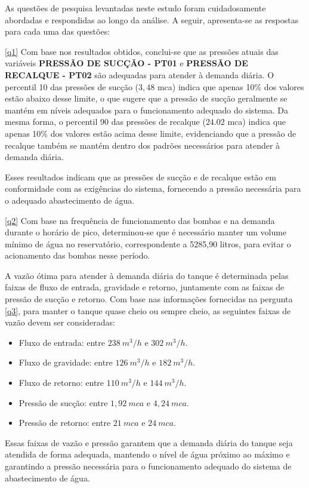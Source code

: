As questões de pesquisa levantadas neste estudo foram cuidadosamente abordadas e respondidas ao longo da análise. A seguir, apresenta-se as respostas para cada uma das questões:

\ref{q1} Com base nos resultados obtidos, conclui-se que as pressões atuais das variáveis \textbf{PRESSÃO DE SUCÇÃO - PT01} e \textbf{PRESSÃO DE RECALQUE - PT02} são adequadas para atender à demanda diária. O percentil 10 das pressões de sucção ($3,48$ mca) indica que apenas 10\% dos valores estão abaixo desse limite, o que sugere que a pressão de sucção geralmente se mantém em níveis adequados para o funcionamento adequado do sistema. Da mesma forma, o percentil 90 das pressões de recalque ($24.02$ mca) indica que apenas 10\% dos valores estão acima desse limite, evidenciando que a pressão de recalque também se mantém dentro dos padrões necessários para atender à demanda diária.

Esses resultados indicam que as pressões de sucção e de recalque estão em conformidade com as exigências do sistema, fornecendo a pressão necessária para o adequado abastecimento de água.

\ref{q2} Com base na frequência de funcionamento das bombas e na demanda durante o horário de pico, determinou-se que é necessário manter um volume mínimo de água no reservatório, correspondente a 5285,90 litros, para evitar o acionamento das bombas nesse período.

A vazão ótima para atender à demanda diária do tanque é determinada pelas faixas de fluxo de entrada, gravidade e retorno, juntamente com as faixas de pressão de sucção e retorno. Com base nas informações fornecidas na pergunta \ref{q3}, para manter o tanque quase cheio ou sempre cheio, as seguintes faixas de vazão devem ser consideradas:

\begin{itemize}
	\item Fluxo de entrada: entre $238 \ m^3/h$ e $302 \ m^3/h$.
	\item Fluxo de gravidade: entre $126 \ m^3/h$ e $182 \ m^3/h$.
	\item Fluxo de retorno: entre $110 \ m^3/h$ e $144 \ m^3/h$.
	\item Pressão de sucção: entre $1,92 \ mca$ e $4,24 \ mca$.
	\item Pressão de retorno: entre $21 \ mca$ e $24 \ mca$.
\end{itemize}

Essas faixas de vazão e pressão garantem que a demanda diária do tanque seja atendida de forma adequada, mantendo o nível de água próximo ao máximo e garantindo a pressão necessária para o funcionamento adequado do sistema de abastecimento de água.


